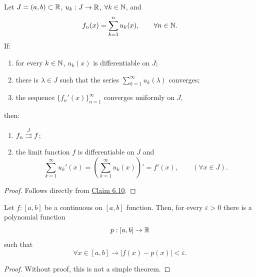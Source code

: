 \begin{claim}\label{claim:6.13}
Let $J=(a,b)\subset\mathbb{R}$, $u_k:J\to\mathbb{R}$, $\forall k\in\mathbb{N}$, and
\[
f_n(x)=\sum_{k=1}^{n}u_k(x),\qquad \forall n\in\mathbb{N}.
\]
If:
\begin{enumerate}[label=\alph*)]
    \item\label{item:claim:6.13:a} for every $k\in\mathbb{N}$, $u_k(x)$ is differentiable on $J$;
    \item\label{item:claim:6.13:b} there is $\lambda\in J$ such that the series $\displaystyle\sum_{k=1}^{\infty}u_k(\lambda)$ converges;
    \item\label{item:claim:6.13:c} the sequence $\{f_n'(x)\}_{n=1}^{\infty}$ converges uniformly on $J$,
\end{enumerate}
then:
\begin{enumerate}
    \item\label{item:claim:6.13:1} $f_n\mathrel{\overset{J}{\rightrightarrows}}f$;
    \item\label{item:claim:6.13:2} the limit function $f$ is differentiable on $J$ and
    \[
    \sum_{k=1}^{\infty}u_k'(x)
    =\left(\sum_{k=1}^{\infty}u_k(x)\right)'
    =f'(x),
    \qquad (\forall x\in J).
    \]
\end{enumerate}
\end{claim}

\begin{proof}
Follows directly from \hyperref[claim:6.10]{Claim 6.10}.
\end{proof}

\begin{claim}\label{claim:6.14}
Let $f:[a,b]$ be a continuous on $[a,b]$ function.
Then, for every $\varepsilon>0$ there is a polynomial function
\[
p:[a,b]\to\mathbb{R}
\]
such that
\[
\forall x\in[a,b]\to |f(x)-p(x)|<\varepsilon.
\]
\end{claim}

\begin{proof}
Without proof, this is not a simple theorem.
\end{proof}
